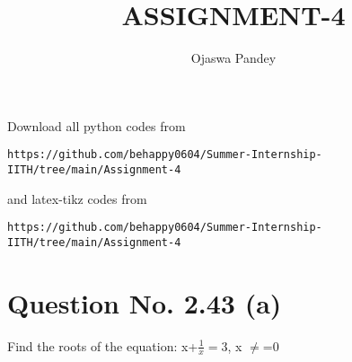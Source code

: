 \documentclass[journal,12pt,twocolumn]{IEEEtran}
\begin{document}
     \def\topbox#1{\raisebox{-\baselineskip}[0in][0in]{#1}}
     \def\midbox#1{\raisebox{-0.5\baselineskip}[0in][0in]{#1}}
\vspace{3cm}
\title{ASSIGNMENT-4}
\author{Ojaswa Pandey}
\maketitle
\newpage
\bigskip
\renewcommand{\thefigure}{\theenumi}
\renewcommand{\thetable}{\theenumi}
Download all python codes from 
\begin{lstlisting}
https://github.com/behappy0604/Summer-Internship-IITH/tree/main/Assignment-4
\end{lstlisting}
%
and latex-tikz codes from 
%
\begin{lstlisting}
https://github.com/behappy0604/Summer-Internship-IITH/tree/main/Assignment-4
\end{lstlisting}
%
\section{Question No. 2.43 (a)}   
Find the roots of the equation:
x+$\frac{1}{x} =3$,  x $\neq$=0  
\end{document}
